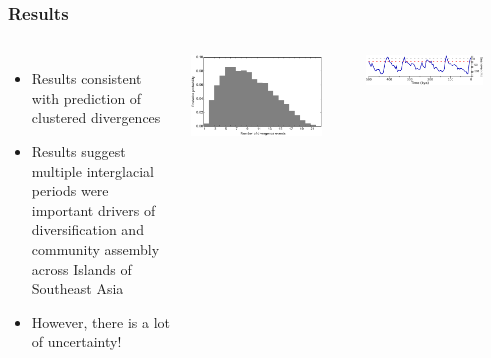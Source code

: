 \begin{frame}
\begin{columns}[c]
\begin{minipage}[t][1.0\textheight][c]{\linewidth}
            
        \end{minipage}
\end{columns}
\end{frame}

\begin{frame}
    \frametitle{Results}
    \begin{adjustwidth}{-4.5em}{-2.5em}
    \begin{columns}
    \begin{itemize}
            \small
        \item<2-> Results consistent with prediction of clustered
            divergences
        \item<3-> Results suggest multiple interglacial periods were important
            drivers of diversification and community assembly across Islands of
            Southeast Asia
        \item<4-> However, there is a lot of uncertainty!
    \end{itemize}
    \centerline{
    \includegraphics[width=0.85\textwidth]{../../empirical-analyses/plots/philippines-dpp-psi-posterior.pdf}}
    \smallskip
    \centerline{
    \includegraphics[width=0.8\textwidth]{../images/sea-level-only.pdf}}
    \end{columns}
    \end{adjustwidth}
\end{frame}

